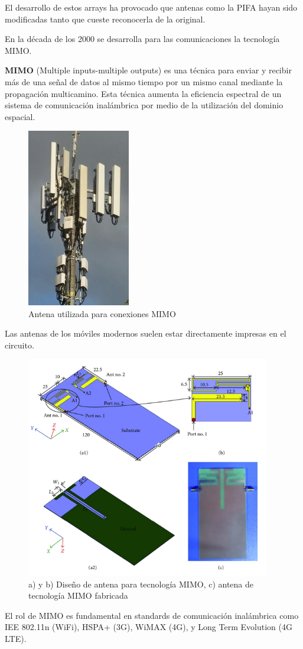 \documentclass[a4paper,11pt,titlepage]{article}
\begin{document}
El desarrollo de estos arrays ha provocado que antenas como la PIFA hayan sido modificadas tanto que cueste reconocerla de la original. \par
En la década de los 2000 se desarrolla para las comunicaciones la tecnología MIMO.\par
\textbf{MIMO} (Multiple inputs-multiple outputs) es una técnica para enviar y recibir más de una señal de datos al mismo tiempo por un mismo canal mediante la propagación multicamino. Esta técnica aumenta la eficiencia espectral de un sistema de comunicación inalámbrica por medio de la utilización del dominio espacial.
\begin{figure}[H]
\centering
\includegraphics[width=0.4\textwidth]{mimo}
\caption{Antena utilizada para conexiones MIMO}
\end{figure}
Las antenas de los móviles modernos suelen estar directamente impresas en el circuito.\par
\begin{figure}[H]
\centering
\includegraphics[width=0.95\textwidth]{mimomovil}
\caption{a) y b) Diseño de antena para tecnología MIMO, c) antena de tecnología MIMO fabricada}
\end{figure}
El rol de MIMO es fundamental en standards de comunicación inalámbrica como IEE 802.11n (WiFi), HSPA+ (3G), WiMAX (4G), y Long Term Evolution (4G LTE).
\end{document}
